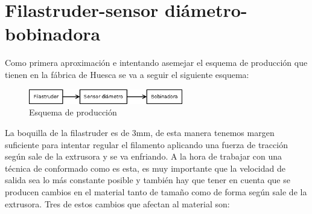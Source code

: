 \section{Filastruder-sensor diámetro-bobinadora}
\label{sec:FSB}

Como primera aproximación e intentando asemejar el esquema de producción que tienen en la fábrica de Huesca se va a seguir el siguiente esquema:

	\begin{figure}[H]
            \centering
            \includegraphics[width=0.6\textwidth]{images/producciones/Diagram1.png}
            \caption{Esquema de producción}
            \label{fig:esquemap_FSB}
    \end{figure}

La boquilla de la filastruder es de 3mm, de esta manera tenemos margen suficiente para intentar regular el filamento aplicando una fuerza de tracción según sale de la extrusora y se va enfriando. A la hora de trabajar con una técnica de conformado como es esta, es muy importante que la velocidad de salida sea lo más constante posible y también hay que tener en cuenta que se producen cambios en el material tanto de tamaño como de forma según sale de la extrusora. Tres de estos cambios que afectan al material son: \cite{tecno_polimeros}

